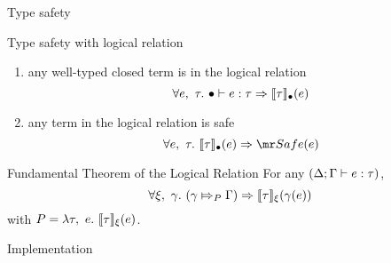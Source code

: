 \documentclass[xcolor={usenames,dvipsnames}]{beamer}
\newcommand\xxsectiontitle[1]{\begin{center}\Huge{#1}\end{center}}
\renewcommand\section[1]{\begin{frame}[noframenumbering]{}\xxsectiontitle{#1}\end{frame}}
\begin{document}
\begin{frame}{Type safety}
  \begin{block}{Type safety with logical relation}
    \begin{enumerate}
      \item any well-typed closed term is in the logical relation
            \[\forall e,\ \tau.\ \bullet \vdash e : \tau \Rightarrow \llbracket \tau \rrbracket_{\bullet}(e) \]
      \item  any term in the logical relation is safe
            \[\forall e,\ \ty.\ \lr{\empctx}{\ty}{e} \Rightarrow \safe(e) \]
   \end{enumerate}

  \end{block}

  \begin{block}{Fundamental Theorem of the Logical Relation}
    For any \((\Delta;\Gamma \vdash e : \tau)\),
    \[
      \forall \xi,\ \gamma.\ (\gamma \Mapsto_{P} \Gamma) \Rightarrow \llbracket \tau \rrbracket_{\xi}(\gamma(e))
    \]
    with $P = \lambda \tau,~e.~ \llbracket \tau \rrbracket_{\xi}(e)$.
  \end{block}
\end{frame}

\section{Implementation}%


\end{document}
